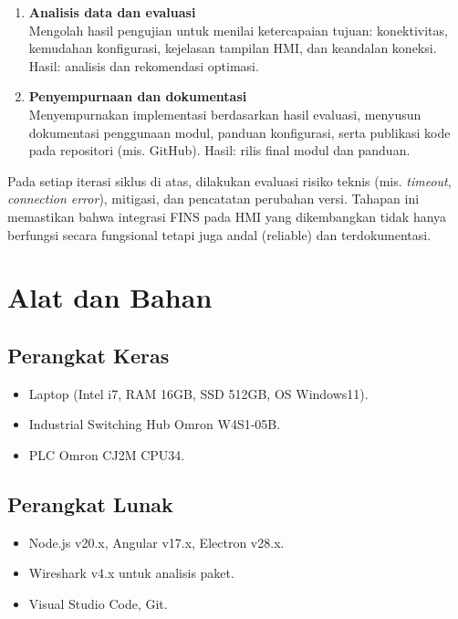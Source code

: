 \begin{enumerate}
    \item \textbf{Analisis data dan evaluasi}\\
    Mengolah hasil pengujian untuk menilai ketercapaian tujuan: konektivitas, kemudahan konfigurasi, kejelasan tampilan HMI, dan keandalan koneksi. 
    Hasil: analisis dan rekomendasi optimasi.

    \item \textbf{Penyempurnaan dan dokumentasi}\\
    Menyempurnakan implementasi berdasarkan hasil evaluasi, menyusun dokumentasi penggunaan modul, panduan konfigurasi, serta publikasi kode pada repositori (mis. GitHub). 
    Hasil: rilis final modul dan panduan.
\end{enumerate}

Pada setiap iterasi siklus di atas, dilakukan evaluasi risiko teknis (mis. \textit{timeout}, \textit{connection error}), mitigasi, dan pencatatan perubahan versi. Tahapan ini memastikan bahwa integrasi FINS pada HMI yang dikembangkan tidak hanya berfungsi secara fungsional tetapi juga andal (reliable) dan terdokumentasi.

\section{Alat dan Bahan}
\subsection{Perangkat Keras}
\begin{itemize}
    \item Laptop (Intel i7, RAM 16GB, SSD 512GB, OS Windows11).
    \item Industrial Switching Hub Omron W4S1-05B.
    \item PLC Omron CJ2M CPU34.
    
\end{itemize}

\subsection{Perangkat Lunak}
\begin{itemize}
    
    \item Node.js v20.x, Angular v17.x, Electron v28.x.
    \item Wireshark v4.x untuk analisis paket.
    \item Visual Studio Code, Git.
\end{itemize}

